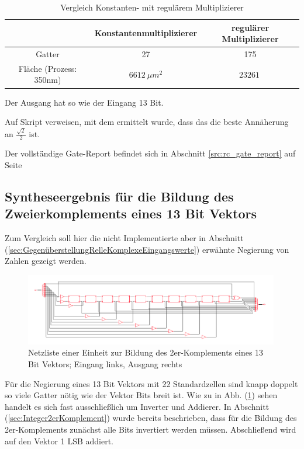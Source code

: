 \begin{table}[!ht]
 \caption{Vergleich Konstanten- mit regulärem Multiplizierer}
 \label{tab:VergleichMultiplizierer}
 \begin{tabular}{ccc}
 \hline
				& Konstantenmultiplizierer 	& regulärer Multiplizierer\\
  \hline	
  Gatter			& 27				& 175 \\
  Fläche (Prozess: 350nm)	& $\SI{6612}{\mu m^2}$		& $\SI{23261}{}$\\
  \hline
 \end{tabular}
\end{table}


Der Ausgang hat so wie der Eingang 13 Bit.

Auf Skript verweisen, mit dem ermittelt wurde, dass das die beste Annäherung an $\frac{\sqrt{2}}{2}$ ist.

Der vollständige Gate-Report befindet sich in Abschnitt \ref{src:rc_gate_report} auf Seite \pageref{src:rc_gate_report}



\subsection{Syntheseergebnis für die Bildung des Zweierkomplements eines 13 Bit Vektors}

Zum Vergleich soll hier die nicht Implementierte aber in Abschnitt (\ref{sec:GegenüberstellungRelleKomplexeEingangswerte}) erwähnte Negierung von Zahlen gezeigt werden.

\begin{figure}[htpb]
\centering
\includegraphics[width=0.99\textwidth]{img/13Bit_Inverter_Netlist.png}
\caption{Netzliste einer Einheit zur Bildung des 2er-Komplements eines 13 Bit Vektors; Eingang links, Ausgang rechts}
\label{pic:13BitInverter}
\end{figure}

Für die Negierung eines 13 Bit Vektors mit 22 Standardzellen sind knapp doppelt so viele Gatter nötig wie der Vektor Bits breit ist. Wie zu in Abb. (\ref{pic:13BitInverter})
sehen handelt es sich fast ausschließlich um Inverter und Addierer. In Abschnitt (\ref{sec:Integer2erKomplement}) wurde bereits beschrieben, dass für die Bildung des
2er-Komplements zunächst alle Bits invertiert werden müssen. Abschließend wird auf den Vektor 1 LSB addiert.
